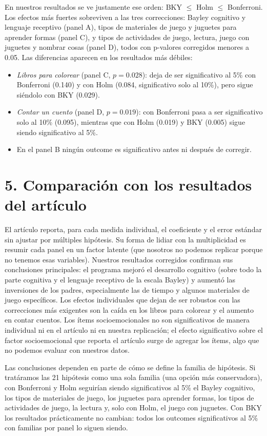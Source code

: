 \documentclass[11pt,a4paper]{article}
\begin{document}
En nuestros resultados se ve justamente ese orden: BKY $\le$ Holm $\le$ Bonferroni. Los efectos más fuertes sobreviven a las tres correcciones: Bayley cognitivo y lenguaje receptivo (panel A), tipos de materiales de juego y juguetes para aprender formas (panel C), y tipos de actividades de juego, lectura, juego con juguetes y nombrar cosas (panel D), todos con p-valores corregidos menores a 0.05. Las diferencias aparecen en los resultados más débiles:
\begin{itemize}
  \item \textit{Libros para colorear} (panel C, $p=0.028$): deja de ser significativo al 5\% con Bonferroni (0.140) y con Holm (0.084, significativo solo al 10\%), pero sigue siéndolo con BKY (0.029).
  \item \textit{Contar un cuento} (panel D, $p=0.019$): con Bonferroni pasa a ser significativo solo al 10\% (0.095), mientras que con Holm (0.019) y BKY (0.005) sigue siendo significativo al 5\%.
  \item En el panel B ningún outcome es significativo antes ni después de corregir.
\end{itemize}

\section*{5. Comparación con los resultados del artículo}

El artículo reporta, para cada medida individual, el coeficiente y el error estándar sin ajustar por múltiples hipótesis. Su forma de lidiar con la multiplicidad es resumir cada panel en un factor latente (que nosotros no podemos replicar porque no tenemos esas variables). Nuestros resultados corregidos confirman sus conclusiones principales: el programa mejoró el desarrollo cognitivo (sobre todo la parte cognitiva y el lenguaje receptivo de la escala Bayley) y aumentó las inversiones de los padres, especialmente las de tiempo y algunos materiales de juego específicos. Los efectos individuales que dejan de ser robustos con las correcciones más exigentes son la caída en los libros para colorear y el aumento en contar cuentos. Los ítems socioemocionales no son significativos de manera individual ni en el artículo ni en nuestra replicación; el efecto significativo sobre el factor socioemocional que reporta el artículo surge de agregar los ítems, algo que no podemos evaluar con nuestros datos.

Las conclusiones dependen en parte de cómo se define la familia de hipótesis. Si tratáramos las 21 hipótesis como una sola familia (una opción más conservadora), con Bonferroni y Holm seguirían siendo significativos al 5\% el Bayley cognitivo, los tipos de materiales de juego, los juguetes para aprender formas, los tipos de actividades de juego, la lectura y, solo con Holm, el juego con juguetes. Con BKY los resultados prácticamente no cambian: todos los outcomes significativos al 5\% con familias por panel lo siguen siendo.
\end{document}
